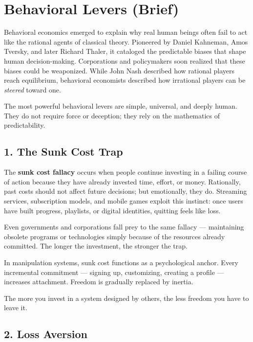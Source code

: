 \documentclass[12pt,twoside]{book}
\begin{document}
\section{Behavioral Levers (Brief)}

Behavioral economics emerged to explain why real human beings often fail to act like the rational agents of classical theory.  
Pioneered by Daniel Kahneman, Amos Tversky, and later Richard Thaler, it cataloged the predictable biases that shape human decision-making.  
Corporations and policymakers soon realized that these biases could be weaponized.  
While John Nash described how rational players reach equilibrium, behavioral economists described how irrational players can be \emph{steered} toward one.

The most powerful behavioral levers are simple, universal, and deeply human.  
They do not require force or deception; they rely on the mathematics of predictability.

\subsection*{1. The Sunk Cost Trap}

The \textbf{sunk cost fallacy} occurs when people continue investing in a failing course of action because they have already invested time, effort, or money.  
Rationally, past costs should not affect future decisions; but emotionally, they do.  
Streaming services, subscription models, and mobile games exploit this instinct: once users have built progress, playlists, or digital identities, quitting feels like loss.  

Even governments and corporations fall prey to the same fallacy --- maintaining obsolete programs or technologies simply because of the resources already committed.  
The longer the investment, the stronger the trap.

In manipulation systems, sunk cost functions as a psychological anchor.  
Every incremental commitment --- signing up, customizing, creating a profile --- increases attachment.  
Freedom is gradually replaced by inertia.\\

\begin{keyidea}
The more you invest in a system designed by others, the less freedom you have to leave it.
\end{keyidea}

\subsection*{2. Loss Aversion}
\end{document}
